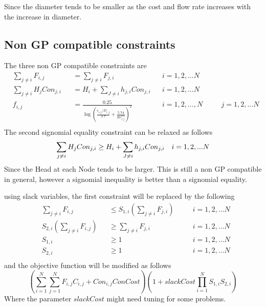 \documentclass[12pt]{article}
\begin{document}
Since the diameter tends to be smaller as the cost and flow rate increases with the increase in diameter.

\subsection{Non GP compatible constraints}
The three non GP compatible constraints are 
\begin{equation}
\begin{aligned}
& \sum_{j \neq i} F_{i,j} && = \sum_{j \neq i} F_{j,i} \quad && i = 1, 2, ... N\\
& \sum_{j \neq i} H_j Con_{j,i} && = H_i + \sum_{J \neq i} h_{j,i}Con_{j,i} && i = 1,2, ...N\\
& f_{i,j} &&= \frac{0.25}{\log\left(\frac{\epsilon_{i,j}/D_{i,j}}{3.7} + \frac{5.74}{Re_{i,j}^{0.9}}\right)^2} && i = 1, 2, ..., N \quad && j = 1, 2, ... N\\
\end{aligned}
\end{equation}
The second signomial equality constraint can be relaxed as follows
\begin{equation}
\sum_{j \neq i} H_j Con_{j,i} \geq H_i + \sum_{J \neq i} h_{j,i}Con_{j,i} \quad i = 1,2, ...N\\
\end{equation}
Since the Head at each Node tends to be larger. This is still a non GP compatible in general, however a signomial inequality is better than a signomial equality.

using slack variables, the first constraint will be replaced by the following
\begin{equation}
\begin{aligned}
& \sum_{j \neq i} F_{i,j} && \leq S_{1,i}(\sum_{j \neq i} F_{j,i}) \quad && i = 1, 2, ... N\\
& S_{2,i}(\sum_{j \neq i} F_{i,j}) && \geq \sum_{j \neq i} F_{j,i} \quad && i = 1, 2, ... N\\
& S_{1,i} && \geq 1 \quad && i = 1, 2, ... N\\
& S_{2,i} && \geq 1 \quad && i = 1, 2, ... N\\
\end{aligned}
\end{equation}
and the objective function will be modified as follows
\begin{equation}
(\sum_{i=1}^{N}\sum_{j=1}^{N} F_{i,j} C_{i,j} + Con_{i,j} ConCost)(1 + slackCost \prod_{i=1}^{N}S_{1,i}S_{2,i})
\end{equation}
Where the parameter $slackCost$ might need tuning for some problems.
\end{document}
